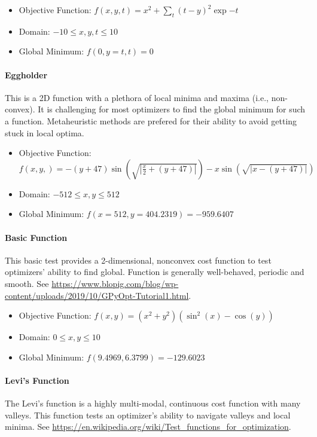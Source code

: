 \begin{itemize}
  \item Objective Function: $f(x,y,t) = x^2 + \sum_{t} (t-y)^2 \exp{-t}$
  \item Domain: $-10 \leq x,y,t \leq 10$
  \item Global Minimum: $f(0,y=t,t) = 0$
\end{itemize}

\paragraph{Eggholder}
This is a 2D function with a plethora of local minima and maxima (i.e., non-convex). It is challenging for most optimizers to find the global minimum for such a function. Metaheuristic methods are prefered for their ability to avoid getting stuck in local optima.

\begin{itemize}
	\item Objective Function: $f(x,y,) =-(y+47) \sin(\sqrt{|\frac{x}{2}+(y+47)|}) - x\sin(\sqrt{|x - (y+47)|})$
	\item Domain: $-512 \leq x,y \leq 512$
	\item Global Minimum: $f(x=512, y=404.2319) = -959.6407$
\end{itemize}

\paragraph{Basic Function}
This basic test provides a 2-dimensional, nonconvex cost function to test optimizers' ability to find global.
Function is generally well-behaved, periodic and smooth.
See \url{https://www.blopig.com/blog/wp-content/uploads/2019/10/GPyOpt-Tutorial1.html}.

\begin{itemize}
  \item Objective Function: $f(x, y) = (x^2 + y^2)(\sin^2(x) - \cos(y))$
  \item Domain: $0 \le x,y \le 10$
  \item Global Minimum: $f(9.4969, 6.3799)=-129.6023$
\end{itemize}

\paragraph{Levi's Function}
The Levi's function is a highly multi-modal, continuous cost function with many valleys. This function
tests an optimizer's ability to navigate valleys and local minima.
See \url{https://en.wikipedia.org/wiki/Test_functions_for_optimization}.

